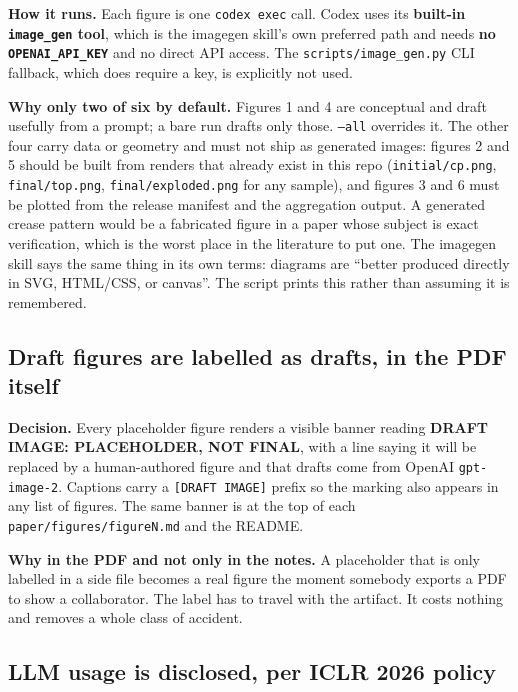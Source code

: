 \textbf{How it runs.} Each figure is one \texttt{codex exec} call. Codex uses its \textbf{built-in
\texttt{image\_gen} tool}, which is the imagegen skill's own preferred path and needs \textbf{no
\texttt{OPENAI\_API\_KEY}} and no direct API access. The \texttt{scripts/image\_gen.py} CLI
fallback, which does require a key, is explicitly not used.

\textbf{Why only two of six by default.} Figures 1 and 4 are conceptual and draft usefully from a
prompt; a bare run drafts only those. \texttt{--all} overrides it. The other four carry data or
geometry and must not ship as generated images: figures 2 and 5 should be built from renders that
already exist in this repo (\texttt{initial/cp.png}, \texttt{final/top.png},
\texttt{final/exploded.png} for any sample), and figures 3 and 6 must be plotted from the release
manifest and the aggregation output. A generated crease pattern would be a fabricated figure in a
paper whose subject is exact verification, which is the worst place in the literature to put one.
The imagegen skill says the same thing in its own terms: diagrams are ``better produced directly in
SVG, HTML/CSS, or canvas''. The script prints this rather than assuming it is remembered.

\subsection{Draft figures are labelled as drafts, in the PDF itself}

\textbf{Decision.} Every placeholder figure renders a visible banner reading \textbf{DRAFT IMAGE:
PLACEHOLDER, NOT FINAL}, with a line saying it will be replaced by a human-authored figure and that
drafts come from OpenAI \texttt{gpt-image-2}. Captions carry a \texttt{[DRAFT IMAGE]} prefix so the
marking also appears in any list of figures. The same banner is at the top of each
\texttt{paper/figures/figureN.md} and the README.

\textbf{Why in the PDF and not only in the notes.} A placeholder that is only labelled in a side
file becomes a real figure the moment somebody exports a PDF to show a collaborator. The label has
to travel with the artifact. It costs nothing and removes a whole class of accident.

\subsection{LLM usage is disclosed, per ICLR 2026 policy}

